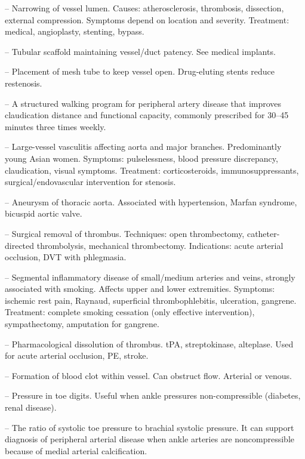 -- Narrowing of vessel lumen. Causes: atherosclerosis, thrombosis, dissection, external compression. Symptoms depend on location and severity. Treatment: medical, angioplasty, stenting, bypass.

-- Tubular scaffold maintaining vessel/duct patency. See medical implants.

-- Placement of mesh tube to keep vessel open. Drug-eluting stents reduce restenosis.

-- A structured walking program for peripheral artery disease that improves claudication distance and functional capacity, commonly prescribed for 30--45 minutes three times weekly.

-- Large-vessel vasculitis affecting aorta and major branches. Predominantly young Asian women. Symptoms: pulselessness, blood pressure discrepancy, claudication, visual symptoms. Treatment: corticosteroids, immunosuppressants, surgical/endovascular intervention for stenosis.


-- Aneurysm of thoracic aorta. Associated with hypertension, Marfan syndrome, bicuspid aortic valve.

-- Surgical removal of thrombus. Techniques: open thrombectomy, catheter-directed thrombolysis, mechanical thrombectomy. Indications: acute arterial occlusion, DVT with phlegmasia.

-- Segmental inflammatory disease of small/medium arteries and veins, strongly associated with smoking. Affects upper and lower extremities. Symptoms: ischemic rest pain, Raynaud, superficial thrombophlebitis, ulceration, gangrene. Treatment: complete smoking cessation (only effective intervention), sympathectomy, amputation for gangrene.

-- Pharmacological dissolution of thrombus. tPA, streptokinase, alteplase. Used for acute arterial occlusion, PE, stroke.

-- Formation of blood clot within vessel. Can obstruct flow. Arterial or venous.

-- Pressure in toe digits. Useful when ankle pressures non-compressible (diabetes, renal disease).

-- The ratio of systolic toe pressure to brachial systolic pressure. It can support diagnosis of peripheral arterial disease when ankle arteries are noncompressible because of medial arterial calcification.

